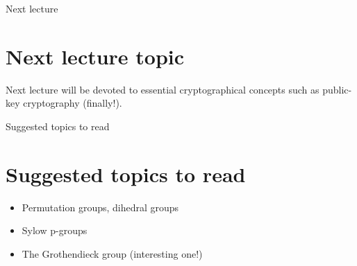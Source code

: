 \documentclass{beamer}
\begin{document}
\begin{frame}{Next lecture}
    \section{Next lecture topic}
	Next lecture will be devoted to essential cryptographical concepts such as 
	public-key cryptography (finally!). 
\end{frame}

\begin{frame}{Suggested topics to read}
    \section{Suggested topics to read}
    \begin{itemize}
		\item Permutation groups, dihedral groups
		\item Sylow p-groups
		\item The Grothendieck group (interesting one!)
	\end{itemize}    
\end{frame}
\end{document}
